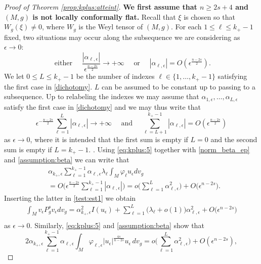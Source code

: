 \documentclass[10pt]{amsart}
\numberwithin{equation}{section}
\def\ep{{\varepsilon}}
\newcommand{\vp}{\varphi}
\def \ep{\epsilon}
\theoremstyle{plain}
\theoremstyle{remark}
\begin{document}
\begin{proof}[Proof of Theorem \ref{prop:kplus:atteint}]
\textbf{We first assume that  $n \ge 2s+4$ and $(M,g)$ is not locally conformally flat.} Recall that $\xi$ is chosen so that $W_g(\xi) \neq 0$, where $W_g$ is the Weyl tensor of $(M,g)$. For each $1 \le \ell \le k_+-1$ fixed, two situations may occur along the subsequence we are considering as $\ep \to 0$: 
\begin{equation} \label{dichotomy}
 \text{ either } \quad \frac{|\alpha_{\ell,\ep}| }{\ep^{\frac{n-2s}{2}}} \to + \infty \quad \text{ or } \quad  |\alpha_{\ell,\ep}| = O(\ep^{\frac{n-2s}{2}}).
 \end{equation}
We let $0 \le L \le k_+-1$ be the number of indexes $\ell \in \{1, \dots, k_+-1\}$ satisfying the first case in \eqref{dichotomy}. $L$ can be assumed to be constant up to passing to a subsequence. Up to relabeling the indexes we may assume that $\alpha_{1, \ep}, \dots, \alpha_{L,\ep}$ satisfy the first case in \eqref{dichotomy} and we may thus write that 
\begin{equation} \label{assumption:beta}
 \ep^{-\frac{n-2s}{2}}  \sum_{\ell=1}^L |\alpha_{\ell,\ep}| \to + \infty  \quad \text{ and } \quad   \sum_{\ell = L+1}^{k_+-1} |\alpha_{\ell,\ep}| = O (\ep^{\frac{n-2s}{2}})
 \end{equation}
 as  $\ep \to 0$, where it is intended that the first sum is empty if $L=0$ and the second sum is empty if $L= k_+-1$. . Using  \eqref{eq:kplus:5} together with \eqref{norm_beta_ep} and  \eqref{assumption:beta} we can write that  
$$ \begin{aligned}
&\alpha_{k_+,\ep}\sum_{\ell=1}^{k_+-1}  \alpha_{\ell,\ep}\lambda_\ell \int_{M} \vp_\ell u_\ep dv_g \\
& = O \Big( \ep^{\frac{n-2s}{2}} \sum_{\ell=1}^{k_+-1} |\alpha_{\ell,\ep}| \Big) = o \Big( \sum_{\ell=1}^{L} \alpha_{\ell,\ep}^2 \Big) + O\big( \ep^{n-2s} \big). 
\end{aligned} $$
Inserting the latter in \eqref{test:est1} we obtain
\begin{equation}
\begin{aligned} \label{test:est4}
  \int_{M} v_\ep P_g^s v_\ep dv_g  =   \alpha_{k_+, \ep}^2 I(u_\ep)  + \sum_{\ell=1}^{L} \big( \lambda_\ell + o(1) \big) \alpha_{\ell,\ep}^2 + O\big( \ep^{n-2s} \big)\\
\end{aligned}
\end{equation}
as $\ep \to 0$. Similarly, \eqref{eq:kplus:5} and \eqref{assumption:beta} show that 
$$  2\alpha_{k_+,\ep}\sum_{\ell=1}^{k_+-1}\alpha_{\ell,\ep} \int_{M} \varphi_{\ell,\ep}|u_{\ep}|^{\frac{4s}{n-2s}} u_\ep \, dv_g  = o \Big( \sum_{\ell=1}^{L} \alpha_{\ell,\ep}^2 \Big) + O(\ep^{n-2s}),$$

\end{proof}
\end{document}
